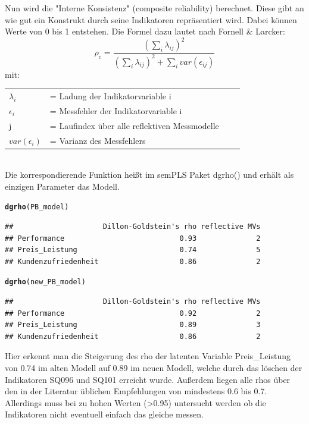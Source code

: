 \documentclass{article}\usepackage[]{graphicx}\usepackage[]{color}
\makeatletter
\newcommand{\hlstd}[1]{\textcolor[rgb]{0.345,0.345,0.345}{#1}}%
\newcommand{\hlkwd}[1]{\textcolor[rgb]{0.737,0.353,0.396}{\textbf{#1}}}%
\newenvironment{kframe}{%
 \def\at@end@of@kframe{}%
 \ifinner\ifhmode%
  \def\at@end@of@kframe{\end{minipage}}%
  \begin{minipage}{\columnwidth}%
 \fi\fi%
 \def\FrameCommand##1{\hskip\@totalleftmargin \hskip-\fboxsep
 \colorbox{shadecolor}{##1}\hskip-\fboxsep
     \hskip-\linewidth \hskip-\@totalleftmargin \hskip\columnwidth}%
 \MakeFramed {\advance\hsize-\width
   \@totalleftmargin\z@ \linewidth\hsize
   \@setminipage}}%
 {\par\unskip\endMakeFramed%
 \at@end@of@kframe}
\newenvironment{knitrout}{}{} %
\makeatother
\begin{document}
Nun wird die "Interne Konsistenz" (composite reliability) berechnet. Diese gibt an wie gut ein Konstrukt durch seine Indikatoren repräsentiert wird. Dabei können Werte von 0 bis 1 entstehen. Die Formel dazu lautet nach Fornell \& Larcker:\cite{fornell1981structural}
\begin{equation}
\rho_{c} = \frac{(\sum_{i}^{}\lambda_{ij})^{2}}{(\sum_{i}^{}\lambda_{ij})^{2}+\sum_{i}^{}var(\epsilon_{ij})}
\end{equation}
mit:\\
\begin{tabular}{llll}
$\lambda_{i}$  &= Ladung der Indikatorvariable i\\
$\epsilon_{i}$ &= Messfehler der Indikatorvariable i\\
j  &= Laufindex über alle reflektiven Messmodelle\\
$var(\epsilon_{i})$ &= Varianz des Messfehlers\\
\end{tabular}
\\
Die korrespondierende Funktion heißt im semPLS Paket dgrho() und erhält als einzigen Parameter das Modell.
\begin{knitrout}
\color{fgcolor}\begin{kframe}
\begin{alltt}
\hlkwd{dgrho}\hlstd{(PB_model)}
\end{alltt}
\begin{verbatim}
##                     Dillon-Goldstein's rho reflective MVs
## Performance                           0.93              2
## Preis_Leistung                        0.74              5
## Kundenzufriedenheit                   0.86              2
\end{verbatim}
\begin{alltt}
\hlkwd{dgrho}\hlstd{(new_PB_model)}
\end{alltt}
\begin{verbatim}
##                     Dillon-Goldstein's rho reflective MVs
## Performance                           0.92              2
## Preis_Leistung                        0.89              3
## Kundenzufriedenheit                   0.86              2
\end{verbatim}
\end{kframe}
\end{knitrout}
Hier erkennt man die Steigerung des rho der latenten Variable Preis\_Leistung von 0.74 im alten Modell auf 0.89 im neuen Modell, welche durch das löschen der Indikatoren SQ096 und SQ101 erreicht wurde. Außerdem liegen alle rhos über den in der Literatur üblichen Empfehlungen von mindestens 0.6 bis 0.7.\cite{nunnally1978c,bagozzi1988evaluation} Allerdings muss bei zu hohen Werten (>0.95) untersucht werden ob die Indikatoren nicht eventuell einfach das gleiche messen.
\end{document}

